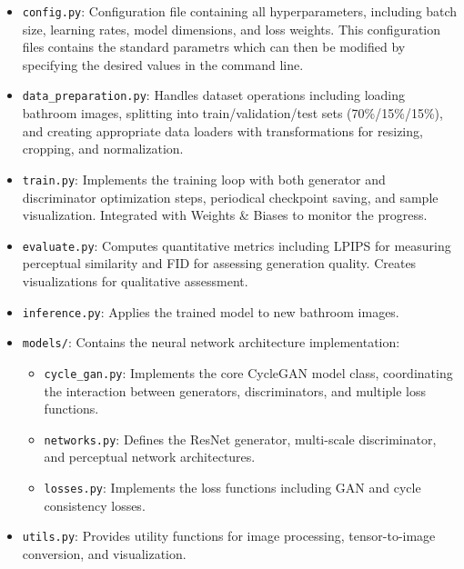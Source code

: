 \documentclass[twocolumn,superscriptaddress,aps]{revtex4-1}
\begin{document}
\begin{itemize}
    \item \texttt{config.py}: Configuration file containing all hyperparameters, including batch size, learning rates, model dimensions, and loss weights. This configuration files contains the standard parametrs which can then be modified by specifying the desired values in the command line.
    
    \item \texttt{data\_preparation.py}: Handles dataset operations including loading bathroom images, splitting into train/validation/test sets (70\%/15\%/15\%), and creating appropriate data loaders with transformations for resizing, cropping, and normalization.
    
    \item \texttt{train.py}: Implements the training loop with both generator and discriminator optimization steps, periodical checkpoint saving, and sample visualization. Integrated with Weights \& Biases to monitor the progress.
    
    \item \texttt{evaluate.py}: Computes quantitative metrics including LPIPS for measuring perceptual similarity and FID for assessing generation quality. Creates visualizations for qualitative assessment.
    
    \item \texttt{inference.py}: Applies the trained model to new bathroom images.
    
    \item \texttt{models/}: Contains the neural network architecture implementation:
    \begin{itemize}
        \item \texttt{cycle\_gan.py}: Implements the core CycleGAN model class, coordinating the interaction between generators, discriminators, and multiple loss functions.
        \item \texttt{networks.py}: Defines the ResNet generator, multi-scale discriminator, and perceptual network architectures.
        \item \texttt{losses.py}: Implements the loss functions including GAN and cycle consistency losses.
    \end{itemize}
    
    \item \texttt{utils.py}: Provides utility functions for image processing, tensor-to-image conversion, and visualization.
\end{itemize}
\end{document}
